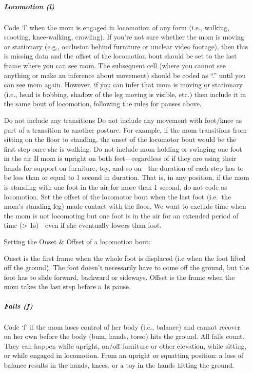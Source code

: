 \documentclass[
  12pt,
]{book}
\begin{document}
\hypertarget{mom_locomotion}{%
\subparagraph*{Locomotion (l)}\label{mom_locomotion}}

Code `l' when the mom is engaged in locomotion of any form (i.e., walking, scooting, knee-walking, crawling).
If you're not sure whether the mom is moving or stationary (e.g., occlusion behind furniture or unclear video footage), then this is missing data and the offset of the locomotion bout should be set to the last frame where you can see mom.
The subsequent cell (where you cannot see anything or make an inference about movement) should be coded as ``.'' until you can see mom again.
However, if you can infer that mom is moving or stationary (i.e., head is bobbing, shadow of the leg moving is visible, etc.) then include it in the same bout of locomotion, following the rules for pauses above.

Do not include any transitions
Do not include any movement with foot/knee as part of a transition to another posture. For example, if the mom transitions from sitting on the floor to standing, the onset of the locomotor bout would be the first step once she is walking.
Do not include mom holding or swinging one foot in the air
If mom is upright on both feet---regardless of if they are using their hands for support on furniture, toy, and so on---the duration of each step has to be less than or equal to 1 second in duration. That is, in any position, if the mom is standing with one foot in the air for more than 1 second, do not code as locomotion. Set the offset of the locomotor bout when the last foot (i.e.~the mom's standing leg) made contact with the floor. We want to exclude time when the mom is not locomoting but one foot is in the air for an extended period of time (\textgreater{} 1s)---even if she eventually lowers than foot.

Setting the Onset \& Offset of a locomotion bout:

Onset is the first frame when the whole foot is displaced (i.e when the foot lifted off the ground). The foot doesn't necessarily have to come off the ground, but the foot has to slide forward, backward or sideways.
Offset is the frame when the mom takes the last step before a 1s pause.

\hypertarget{mom_fall}{%
\subparagraph*{Falls (f)}\label{mom_fall}}

Code `f' if the mom loses control of her body (i.e., balance) and cannot recover on her own before the body (bum, hands, torso) hits the ground. All falls count. They can happen while upright, on/off furniture or other elevation, while sitting, or while engaged in locomotion.
From an upright or squatting position: a loss of balance results in the hands, knees, or a toy in the hands hitting the ground.
\end{document}
